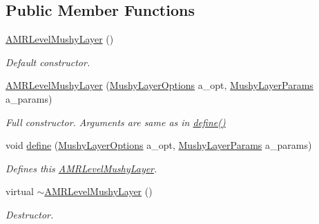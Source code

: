 \subsection*{Public Member Functions}
\begin{DoxyCompactItemize}
\item 
\mbox{\label{class_a_m_r_level_mushy_layer_adfca912f4bbd65b9d39f205a57bc651d}} 
\hyperlink{class_a_m_r_level_mushy_layer_adfca912f4bbd65b9d39f205a57bc651d}{A\+M\+R\+Level\+Mushy\+Layer} ()
\begin{DoxyCompactList}\small\item\em Default constructor. \end{DoxyCompactList}\item 
\mbox{\label{class_a_m_r_level_mushy_layer_aff24e0ecc862006090258067f52e9d4c}} 
\hyperlink{class_a_m_r_level_mushy_layer_aff24e0ecc862006090258067f52e9d4c}{A\+M\+R\+Level\+Mushy\+Layer} (\hyperlink{struct_mushy_layer_options}{Mushy\+Layer\+Options} a\+\_\+opt, \hyperlink{class_mushy_layer_params}{Mushy\+Layer\+Params} a\+\_\+params)
\begin{DoxyCompactList}\small\item\em Full constructor. Arguments are same as in \hyperlink{class_a_m_r_level_mushy_layer_a24f8ccde175e9273958d5511b525cdbb}{define()} \end{DoxyCompactList}\item 
void \hyperlink{class_a_m_r_level_mushy_layer_a24f8ccde175e9273958d5511b525cdbb}{define} (\hyperlink{struct_mushy_layer_options}{Mushy\+Layer\+Options} a\+\_\+opt, \hyperlink{class_mushy_layer_params}{Mushy\+Layer\+Params} a\+\_\+params)
\begin{DoxyCompactList}\small\item\em Defines this \hyperlink{class_a_m_r_level_mushy_layer}{A\+M\+R\+Level\+Mushy\+Layer}. \end{DoxyCompactList}\item 
\mbox{\label{class_a_m_r_level_mushy_layer_aa642109814b6abb109810d1a14f05541}} 
virtual \hyperlink{class_a_m_r_level_mushy_layer_aa642109814b6abb109810d1a14f05541}{$\sim$\+A\+M\+R\+Level\+Mushy\+Layer} ()
\begin{DoxyCompactList}\small\item\em Destructor. \end{DoxyCompactList}\item 

\end{DoxyCompactItemize}
